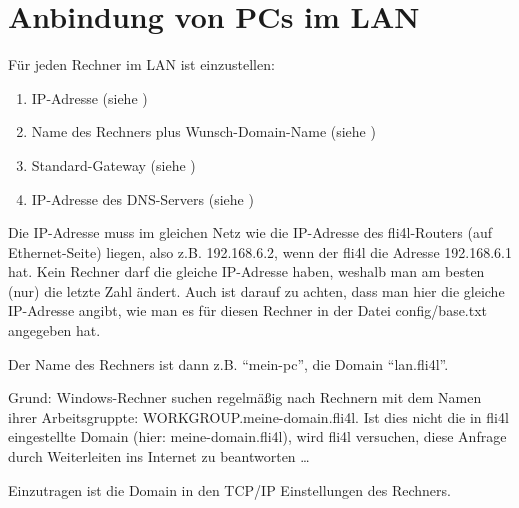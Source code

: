   \chapter{Anbindung von PCs im LAN}

  Für jeden Rechner im LAN ist einzustellen:

  \begin{enumerate}
  \item IP-Adresse (siehe )
  \item Name des Rechners plus Wunsch-Domain-Name
    (siehe )
  \item Standard-Gateway (siehe )
  \item IP-Adresse des DNS-Servers (siehe )
  \end{enumerate}

  Die IP-Adresse muss im gleichen Netz wie die IP-Adresse des
  fli4l-Routers (auf Ethernet-Seite) liegen, also z.B. 192.168.6.2,
  wenn der fli4l die Adresse 192.168.6.1 hat.
  Kein Rechner darf die gleiche IP-Adresse haben, weshalb man am
  besten (nur) die letzte Zahl ändert. Auch ist darauf zu achten, dass
  man hier die gleiche IP-Adresse angibt, wie man es für diesen
  Rechner in der Datei config/base.txt angegeben hat.

  Der Name des Rechners ist dann z.B. ``mein-pc'', die Domain ``lan.fli4l''.


  Grund: Windows-Rechner suchen regelmäßig nach Rechnern mit dem Namen
  ihrer Arbeitsgruppte: WORKGROUP.meine-domain.fli4l. Ist dies nicht die in fli4l
  eingestellte Domain (hier: meine-domain.fli4l), wird fli4l
  versuchen, diese Anfrage durch Weiterleiten ins Internet zu
  beantworten \ldots

  Einzutragen ist die Domain in den TCP/IP Einstellungen des Rechners.

